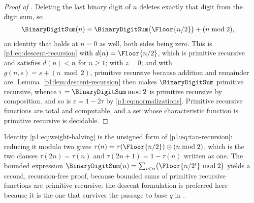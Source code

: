 \documentclass[11pt,oneside]{article}
\numberwithin{equation}{section}
\theoremstyle{definition}
\theoremstyle{remark}
\newcommand{\eps}{\varepsilon}
\newcommand{\xor}{\mathbin{\oplus}}
\begin{document}
\begin{proof}[Proof of ]
Deleting the last binary digit of \(n\) deletes exactly that digit from
the digit sum, so
\begin{equation}
  \BinaryDigitSum(n)=\BinaryDigitSum\bigl(\Floor{n/2}\bigr)+(n\bmod2),
  \label{p1:eq:weight-halving}
\end{equation}
an identity that holds at \(n=0\) as well, both sides being zero.  This
is \eqref{p1:eq:descent-recursion} with \(d(n)=\Floor{n/2}\),
which is primitive recursive and satisfies \(d(n)<n\) for \(n\ge1\);
with \(z=0\); and with \(g(n,s)=s+(n\bmod2)\), primitive recursive
because addition and remainder are.  Lemma~\ref{p1:lem:descent-recursion} then
makes \(\BinaryDigitSum\) primitive recursive, whence \(\tau=\BinaryDigitSum\bmod2\) is
primitive recursive by composition, and so is \(\eps=1-2\tau\) by
\eqref{p1:eq:normalizations}.  Primitive recursive functions are total and
computable, and a set whose characteristic function is primitive recursive
is decidable.
\end{proof}

\begin{remark}
Identity \eqref{p1:eq:weight-halving} is the unsigned form of
\eqref{p1:eq:tau-recursion}: reducing it modulo two gives
\(\tau(n)=\tau(\Floor{n/2})\xor(n\bmod2)\), which is the two
clauses \(\tau(2n)=\tau(n)\) and \(\tau(2n+1)=1-\tau(n)\) written as
one.  The bounded expression
\(\BinaryDigitSum(n)=\sum_{i<n}\bigl(\Floor{n/2^i}\bmod2\bigr)\) yields a
second, recursion-free proof, because bounded sums of primitive recursive
functions are primitive recursive; the descent formulation is preferred
here because it is the one that survives the passage to base \(q\) in
.
\end{remark}
\end{document}
